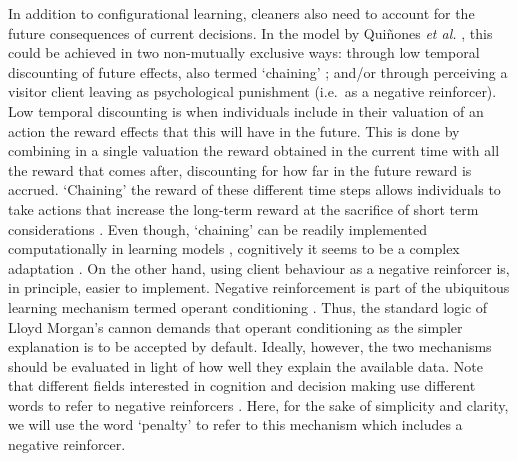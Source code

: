 \documentclass[]{rsos}%
\begin{document}
In addition to configurational learning, cleaners also need to account for
the future consequences of current decisions. In the model by
Quiñones \emph{et al.} \citep{quinones_Reinforcement_2019}, this could be achieved in
two non-mutually exclusive ways: through low temporal discounting of
future effects, also termed `chaining' \citep{enquist_Power_2016}; and/or
through perceiving a visitor client leaving as psychological punishment
(i.e.~as a negative reinforcer). Low temporal discounting is when
individuals include in their valuation of an action the reward effects
that this will have in the future. This is done by combining in a single
valuation the reward obtained in the current time with all the reward that
comes after, discounting for how far in the future reward
is accrued. `Chaining' the reward of these different time steps allows
individuals to take actions that increase the long-term reward at the sacrifice
of short term considerations \citep{enquist_Power_2016}. Even though, `chaining'
can be readily implemented computationally in learning models
\citep{enquist_Power_2016, sutton_Reinforcement_2018}, cognitively it seems to be
a complex adaptation \citep{suddendorf_Evolution_2007}. On the other hand,
using client behaviour as a negative reinforcer is, in principle,
easier to implement. Negative reinforcement is part of the ubiquitous
learning mechanism termed operant conditioning \citep{thorndike_Animal_1898, skinner_Behavior_1938}. Thus, the standard logic of
Lloyd Morgan's cannon demands that operant conditioning as the simpler
explanation is to be accepted by default. Ideally, however, the two
mechanisms should be evaluated in light of how well
they explain the available data. Note that different fields interested in
cognition and decision making use different words to refer to negative
reinforcers \citep{quinones_Reinforcement_2019, sutton_Reinforcement_2018}.
Here, for the sake of simplicity and clarity, we will use the word
`penalty' to refer to this mechanism which includes a negative reinforcer.
\end{document}
